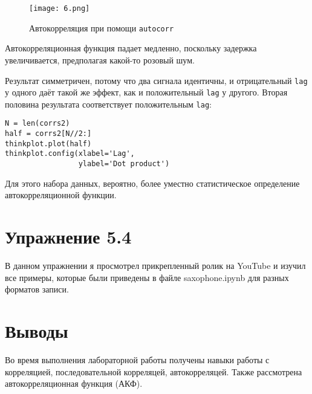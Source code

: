 \documentclass[a4paper,12pt]{report}
\begin{document}
\begin{figure}[H]
        \centering
        \texttt{[image: 6.png]}
        \caption{Автокорреляция при помощи \texttt{autocorr}}
        \label{fig:lab5_fig3_3}
\end{figure}

Автокорреляционная функция падает медленно, поскольку задержка увеличивается, предполагая какой-то розовый шум.


Результат симметричен, потому что два сигнала идентичны, и отрицательный \texttt{lag} у одного даёт такой же эффект, как и положительный \texttt{lag} у другого. Вторая половина результата соответствует положительным \texttt{lag}:

\begin{lstlisting}[caption=Вторая половина результата]
N = len(corrs2)
half = corrs2[N//2:]
thinkplot.plot(half)
thinkplot.config(xlabel='Lag',
                 ylabel='Dot product')
\end{lstlisting}

Для этого набора данных, вероятно, более уместно статистическое определение автокорреляционной функции.

\chapter{Упражнение 5.4}

В данном упражнении я просмотрел прикрепленный ролик на YouTube и изучил все примеры, которые были приведены в файле saxophone.ipynb для разных форматов записи.

\chapter{Выводы}

Во время выполнения лабораторной работы получены навыки работы с корреляцией, последовательной корреляцей, автокорреляцей. Также рассмотрена автокорреляционная функция (АКФ).
\end{document}
